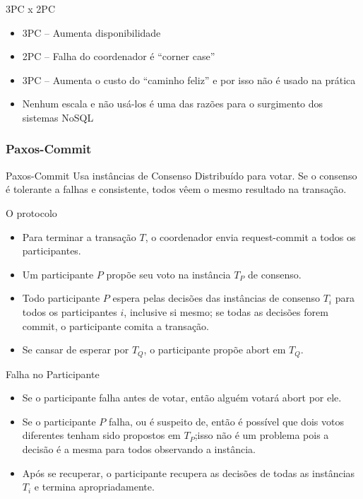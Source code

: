 \begin{frame}{3PC x 2PC}
	\begin{itemize}
		\item 3PC -- Aumenta disponibilidade
		\item 2PC -- Falha do coordenador é ``corner case''
		\item 3PC -- Aumenta o custo do ``caminho feliz'' e por isso não é usado na prática
		\item Nenhum escala e não usá-los é uma das razões para o surgimento dos sistemas NoSQL
	\end{itemize}
\end{frame}

\subsubsection{Paxos-Commit}
\begin{frame}{Paxos-Commit}
Usa instâncias de Consenso Distribuído para votar. Se o consenso é tolerante a falhas e consistente, todos vêem o mesmo resultado na transação.
\end{frame}

\begin{frame}{O protocolo}
\begin{itemize}
	\item Para terminar a transação $T$, o coordenador envia request-commit a todos os participantes.
	\item Um participante $P$ propõe seu voto na instância $T_P$ de consenso.
	\item Todo participante $P$ espera pelas decisões das instâncias de consenso $T_i$ para todos os participantes $i$, inclusive si mesmo; se todas as decisões forem commit, o participante comita a transação.
	
	\item Se cansar de esperar por $T_Q$, o participante propõe abort em $T_Q$.
\end{itemize}
\end{frame}

\begin{frame}{Falha no Participante}
\begin{itemize}
	\item Se o participante falha antes de votar, então alguém votará abort por ele.
	\item Se o participante $P$ falha, ou é suspeito de, então é possível que dois votos diferentes tenham sido propostos em $T_P$;\pause isso não é um problema pois a decisão é a mesma para todos observando a instância.
	\item Após se recuperar, o participante recupera as decisões de todas as instâncias $T_i$ e termina apropriadamente.
\end{itemize}
\end{frame}

